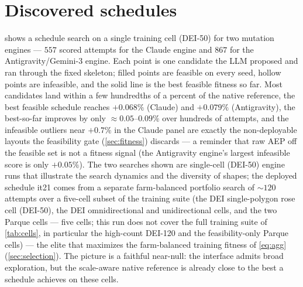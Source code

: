 \documentclass[11pt]{article}
\begin{document}
\section{Discovered schedules}
\label{sec:discovered}
 shows a schedule search on a single training cell (DEI-50) for two mutation engines
--- $557$ scored attempts for the Claude engine and $867$ for the Antigravity/Gemini-3
engine. Each point is one candidate the LLM proposed and ran through the fixed skeleton;
filled points are feasible on every seed, hollow points are infeasible, and the solid
line is the best feasible fitness so far. Most candidates land within a few hundredths of
a percent of the native reference, the best feasible schedule reaches $+0.068\%$ (Claude)
and $+0.079\%$ (Antigravity), the best-so-far improves by only
$\approx\!0.05$--$0.09\%$ over hundreds of attempts, and the infeasible outliers near
$+0.7\%$ in the Claude panel are exactly the non-deployable layouts the feasibility gate
(\cref{sec:fitness}) discards --- a reminder that raw AEP off the feasible set is not a
fitness signal (the Antigravity engine's largest infeasible score is only $+0.05\%$). The
two searches shown are single-cell (DEI-50) engine runs that illustrate the search dynamics and the
diversity of shapes; the deployed schedule it21 comes from a separate farm-balanced
portfolio search of $\sim\!120$ attempts over a five-cell subset of the training suite
(the DEI single-polygon rose cell (DEI-50), the DEI omnidirectional and unidirectional
cells, and the two Parque cells --- five cells; this run does not cover the full training
suite of \cref{tab:cells}, in particular the high-count DEI-120 and the feasibility-only
Parque cells) --- the elite that maximizes the farm-balanced training fitness of
\cref{eq:agg} (\cref{sec:selection}). The
picture is a faithful near-null: the interface admits broad exploration, but the
scale-aware native reference is already close to the best a schedule achieves on these
cells.
\end{document}
